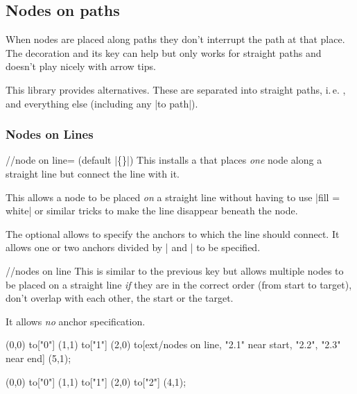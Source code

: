 \begin{multicols}{2}
\subsection{Nodes on paths}
When nodes are placed along paths they don't interrupt
the path at that place.
The decoration 
and its 
key can help but only works for straight paths and
doesn't play nicely with arrow tips.

This library provides alternatives.
These are separated into straight paths, i.\,e. ,
and everything else (including any |to path|).

\subsubsection{Nodes on Lines}

\begin{stylekey}{/\tikzext/node on line= (default |\{\}|)}
This installs a  that places \emph{one}
node along a straight line but connect the line with it.

This allows a node to be placed \emph{on} a straight line without having to
use |fill = white| or similar tricks to make the line disappear 
beneath the node.

The optional  allows to specify the
anchors to which the line should connect.
It allows one or two anchors divided by | and | to be specified.
\end{stylekey}

\begin{stylekey}{/\tikzext/nodes on line}
This is similar to the previous key but allows
multiple nodes to be placed on a straight line
\emph{if} they are in the correct order (from start to target),
don't overlap with each other, the start or the target.

It allows \emph{no} anchor specification.
\end{stylekey}

\begin{codeexample}[preamble=\usetikzlibrary{ext.nodes, quotes}]
\tikz[inner sep=.15em, circle, nodes=draw, sloped]
   (0,0) to["0"] (1,1)
                                                 to["1"] (2,0)
    to[ext/nodes on line, "2.1" near start, "2.2", "2.3" near end] (5,1);
\end{codeexample}
\begin{codeexample}[preamble=\usetikzlibrary{ext.nodes, quotes}]
\tikz[inner sep=.15em, nodes=draw]
  \draw[thick, ->, ext/node on line=west and east]
     (0,0) to["0"] (1,1)
           to["1"] (2,0)
           to["2"] (4,1);
\end{codeexample}


\end{multicols}
